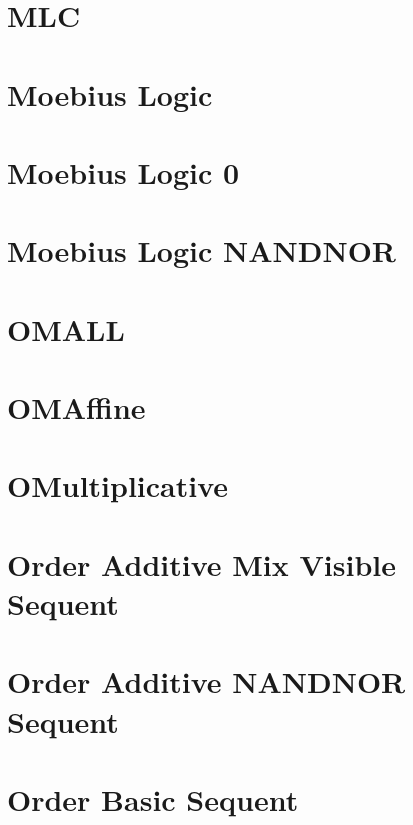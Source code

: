 \documentclass{report}
\begin{document}
\chapter{MLC}


\chapter{Moebius Logic}


\chapter{Moebius Logic 0}


\chapter{Moebius Logic NANDNOR}


\chapter{OMALL}


\chapter{OMAffine}


\chapter{OMultiplicative}


\chapter{Order Additive Mix Visible Sequent}


\chapter{Order Additive NANDNOR Sequent}


\chapter{Order Basic Sequent}

\end{document}
